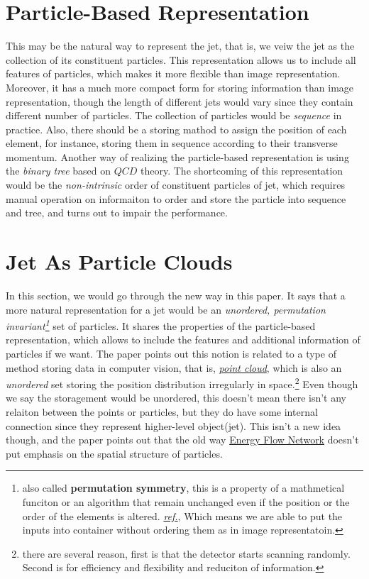 \documentclass[12pt]{article}
\numberwithin{equation}{section}
\begin{document}
\section{Particle-Based Representation}

This may be the natural way to represent the jet, that is, we veiw the jet as the collection of its constituent particles. This representation allows us to include all features of particles, which makes it more flexible than image representation. Moreover, it has a much more compact form for storing information than image representation, though the length of different jets would vary since they contain different number of particles. The collection of particles would be \textit{sequence} in practice. Also, there should be a storing mathod to assign the position of each element, for instance, storing them in sequence according to their transverse momentum. Another way of realizing the particle-based representation is using the \textit{binary tree} based on $QCD$ theory. The shortcoming of this representation would be the \textit{non-intrinsic} order of constituent particles of jet, which requires manual operation on informaiton to order and store the particle into sequence and tree, and turns out to impair the performance.

\section{Jet As Particle Clouds}

In this section, we would go through the new way in this paper. It says that a more natural representation for a jet would be an \textit{unordered, permutation invariant\footnote{also called \textbf{permutation symmetry}, this is a property of a mathmetical funciton or an algorithm that remain unchanged even if the position or the order of the elements is altered. \href{https://medium.com/@he165076373/what-is-permutation-invariance-a-brief-introduction-58ecb7a49334}{\textit{ref.}}, Which means we are able to put the inputs into container without ordering them as in image representatoin.}} set of particles. It shares the properties of the particle-based representation, which allows to include the features and additional information of particles if we want. The paper points out this notion is related to a type of method storing data in computer vision, that is, \href{https://en.wikipedia.org/wiki/Point_cloud}{\textit{point cloud}}, which is also an \textit{unordered} set storing the position distribution irregularly in space.\footnote{there are several reason, first is that the detector starts scanning randomly. Second is for efficiency and flexibility and reduciton of information.} Even though we say the storagement would be unordered, this doesn't mean there isn't any relaiton between the points or particles, but they do have some internal connection since they represent higher-level object(jet). This isn't a new idea though, and the paper points out that the old way \href{chrome-extension://efaidnbmnnnibpcajpcglclefindmkaj/https://arxiv.org/pdf/1810.05165.pdf}{Energy Flow Network} doesn't put emphasis on the spatial structure of particles.
\end{document}
